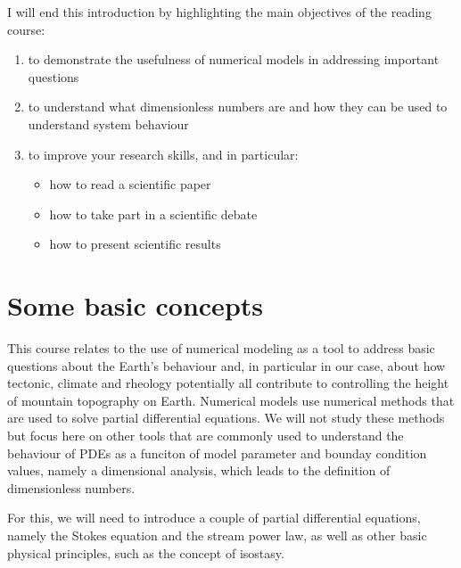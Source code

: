 \documentclass[letterpaper,10pt,english]{jupyterBook}
\begin{document}
\sphinxAtStartPar
I will end this introduction by highlighting the main objectives of the reading course:
\begin{enumerate}
%
\item {} 
\sphinxAtStartPar
to demonstrate the usefulness of numerical models in addressing important questions

\item {} 
\sphinxAtStartPar
to understand what dimensionless numbers are and how they can be used to understand system behaviour

\item {} 
\sphinxAtStartPar
to improve your research skills, and in particular:
\begin{itemize}
\item {} 
\sphinxAtStartPar
how to read a scientific paper

\item {} 
\sphinxAtStartPar
how to take part in a scientific debate

\item {} 
\sphinxAtStartPar
how to present scientific results

\end{itemize}

\end{enumerate}

\sphinxstepscope


\chapter{Some basic concepts}
\label{\detokenize{concepts:some-basic-concepts}}\label{\detokenize{concepts::doc}}
\sphinxAtStartPar
This course relates to the use of numerical modeling as a tool to address basic questions about the Earth’s behaviour and, in particular in our case, about how tectonic, climate and rheology potentially all contribute to controlling the height of mountain topography on Earth. Numerical models use numerical methods that are used to solve partial differential equations. We will not study these methods but focus here on other tools that are commonly used to understand the behaviour of PDEs as a funciton of model parameter and bounday condition values, namely a dimensional analysis, which leads to the definition of dimensionless numbers.

\sphinxAtStartPar
For this, we will need to introduce a couple of partial differential equations, namely the Stokes equation and the stream power law, as well as other basic physical principles, such as the concept of isostasy.
\end{document}
